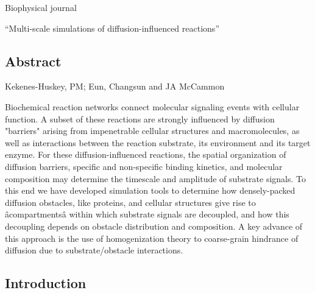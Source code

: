 Biophysical journal 


 ``Multi-scale simulations of diffusion-influenced reactions''

\subsection{Abstract}

Kekenes-Huskey, PM; Eun, Changsun and JA McCammon

Biochemical reaction networks connect molecular signaling events with cellular function. 
A subset of these reactions are strongly influenced by diffusion "barriers" arising from impenetrable cellular structures and macromolecules, as well as interactions between the reaction substrate, its environment and its target enzyme.
For these diffusion-influenced reactions, the spatial organization of diffusion barriers, specific and non-specific binding kinetics, and molecular composition may determine the timescale and amplitude of substrate signals. 
To this end we have developed simulation tools to determine how densely-packed diffusion obstacles, like proteins, and cellular structures give rise to  âcompartmentsâ within which substrate signals are decoupled, and how this decoupling depends on obstacle distribution and composition.
A key advance of this approach is the use of homogenization theory to coarse-grain hindrance of diffusion due to substrate/obstacle interactions.




\subsection{Introduction}

